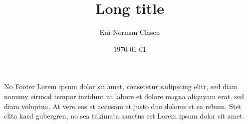 \documentclass[aspectratio=169]{beamer}
\title[No footer]{Long title}
\author{Kai Norman Clasen}
\institute{}
\date{\today}
\begin{document}
  \begin{frame}{No Footer}
    Lorem ipsum dolor sit amet, consetetur sadipscing elitr, 
    sed diam nonumy eirmod tempor invidunt ut labore et dolore 
    magna aliquyam erat, sed diam voluptua. 
    At vero eos et accusam et justo duo dolores et ea rebum. 
    Stet clita kasd gubergren, no sea takimata sanctus est 
    Lorem ipsum dolor sit amet.
  \end{frame}
\end{document}
